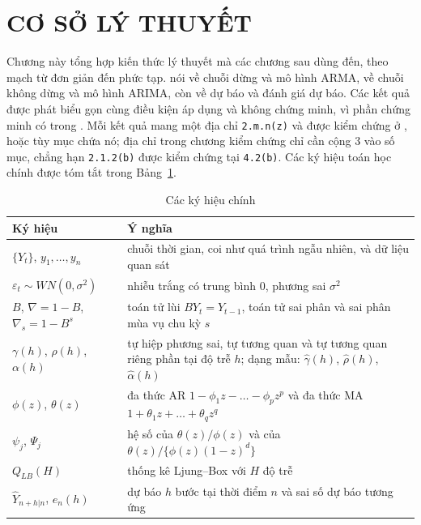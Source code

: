 \clearpage
\section[Cơ sở lý thuyết]{CƠ SỞ LÝ THUYẾT}

Chương này tổng hợp kiến thức lý thuyết mà các chương sau dùng đến, theo mạch từ đơn giản đến phức tạp.  nói về chuỗi dừng và mô hình ARMA,  về chuỗi không dừng và mô hình ARIMA, còn  về dự báo và đánh giá dự báo. Các kết quả được phát biểu gọn cùng điều kiện áp dụng và không chứng minh, vì phần chứng minh có trong . Mỗi kết quả mang một địa chỉ \texttt{2.m.n(z)} và được kiểm chứng ở ,  hoặc  tùy mục chứa nó; địa chỉ trong chương kiểm chứng chỉ cần cộng $3$ vào số mục, chẳng hạn \texttt{2.1.2(b)} được kiểm chứng tại \texttt{4.2(b)}. Các ký hiệu toán học chính được tóm tắt trong Bảng~\ref{tab:kyhieu}.

\begin{table}[H]
\centering\small
\caption{Các ký hiệu chính}\label{tab:kyhieu}
\renewcommand{\arraystretch}{1.25}
\begin{tabular}{@{}p{3.4cm}p{12.6cm}@{}}
\toprule
Ký hiệu & Ý nghĩa \\
\midrule
$\{Y_t\}$, $y_1,\dots,y_n$ & chuỗi thời gian, coi như quá trình ngẫu nhiên, và dữ liệu quan sát \\
$\varepsilon_t\sim WN(0,\sigma^2)$ & nhiễu trắng có trung bình $0$, phương sai $\sigma^2$ \\
$B$, $\nabla=1-B$, $\nabla_s=1-B^s$ & toán tử lùi $BY_t=Y_{t-1}$, toán tử sai phân và sai phân mùa vụ chu kỳ $s$ \\
$\gamma(h)$, $\rho(h)$, $\alpha(h)$ & tự hiệp phương sai, tự tương quan và tự tương quan riêng phần tại độ trễ $h$; dạng mẫu: $\hat\gamma(h)$, $\hat\rho(h)$, $\hat\alpha(h)$ \\
$\phi(z)$, $\theta(z)$ & đa thức AR $1-\phi_1z-\dots-\phi_pz^p$ và đa thức MA $1+\theta_1z+\dots+\theta_qz^q$ \\
$\psi_j$, $\Psi_j$ & hệ số của $\theta(z)/\phi(z)$ và của $\theta(z)/\{\phi(z)(1-z)^d\}$ \\
$Q_{LB}(H)$ & thống kê Ljung--Box với $H$ độ trễ \\
$\hat Y_{n+h|n}$, $e_n(h)$ & dự báo $h$ bước tại thời điểm $n$ và sai số dự báo tương ứng \\
\bottomrule
\end{tabular}
\end{table}

